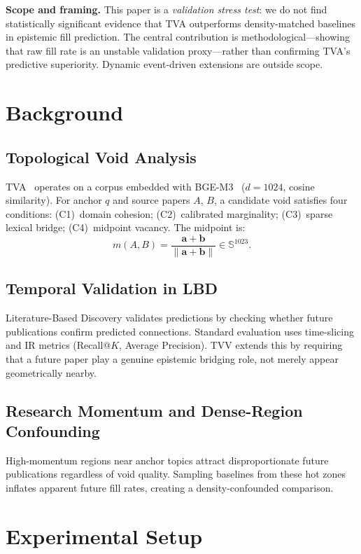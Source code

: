 \documentclass[11pt,twocolumn]{article}
\newcommand{\tva}{\textsf{TVA}}
\newcommand{\tvv}{\textsf{TVV}}
\begin{document}
\textbf{Scope and framing.} This paper is a \emph{validation stress test}: we do not
find statistically significant evidence that TVA outperforms density-matched baselines
in epistemic fill prediction. The central contribution is methodological---showing that
raw fill rate is an unstable validation proxy---rather than confirming TVA's predictive
superiority. Dynamic event-driven extensions are outside scope.

\section{Background}

\subsection{Topological Void Analysis}

\tva{}~\cite{pan2026tva} operates on a corpus embedded with BGE-M3~\cite{bge-m3} ($d=1024$, cosine similarity).
For anchor $q$ and source papers $A$, $B$, a candidate void satisfies four conditions:
(C1)~domain cohesion; (C2)~calibrated marginality; (C3)~sparse lexical bridge;
(C4)~midpoint vacancy. The midpoint is:
\[
m(A,B) = \frac{\mathbf{a}+\mathbf{b}}{\|\mathbf{a}+\mathbf{b}\|} \in \mathbb{S}^{1023}.
\]

\subsection{Temporal Validation in LBD}

Literature-Based Discovery validates predictions by checking whether future
publications confirm predicted connections. Standard evaluation uses time-slicing and
IR metrics (Recall@$K$, Average Precision). \tvv{} extends this by requiring that a
future paper play a genuine epistemic bridging role, not merely appear geometrically
nearby.

\subsection{Research Momentum and Dense-Region Confounding}

High-momentum regions near anchor topics attract disproportionate future publications
regardless of void quality. Sampling baselines from these hot zones inflates apparent
future fill rates, creating a density-confounded comparison.

\section{Experimental Setup}
\end{document}
